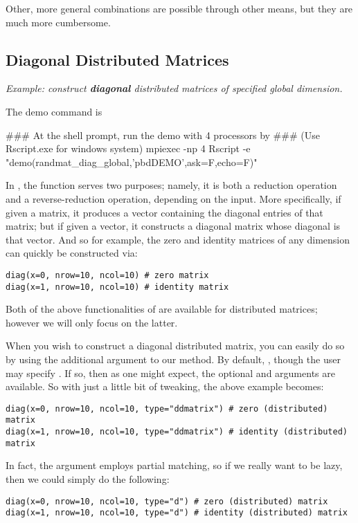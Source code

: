 Other, more general combinations are possible through other means, but they are 
much more cumbersome.




\subsection{Diagonal Distributed Matrices}\label{sub:diag}

\emph{Example:  construct \textbf{diagonal} distributed matrices of specified
global dimension.}

The demo command is
\begin{Command}
### At the shell prompt, run the demo with 4 processors by
### (Use Rscript.exe for windows system)
mpiexec -np 4 Rscript -e "demo(randmat_diag_global,'pbdDEMO',ask=F,echo=F)"
\end{Command}

In , the  function serves two purposes; namely, it is 
both a reduction operation and a reverse-reduction operation, depending on the 
input.  More specifically, if given a matrix, it produces a vector containing 
the diagonal entries of that matrix; but if given a vector, it constructs a 
diagonal matrix whose diagonal is that vector.  And so for example, the zero and 
identity matrices of any dimension can quickly be constructed via:
\begin{lstlisting}[language=rr,title=Diagonal Matrices in R]
diag(x=0, nrow=10, ncol=10) # zero matrix
diag(x=1, nrow=10, ncol=10) # identity matrix
\end{lstlisting}

Both of the above functionalities of  are available for distributed 
matrices; however we will only focus on the latter. 

When you wish to construct a diagonal distributed matrix, you can easily do so 
by using the additional  argument to our  method.  By 
default, , though the user may specify 
.  If so, then as one might expect, the optional 
 and  arguments are available.  So with just a little 
bit of tweaking, the above example becomes:
\begin{lstlisting}[language=rr,title=Diagonal Matrices in pbdR]
diag(x=0, nrow=10, ncol=10, type="ddmatrix") # zero (distributed) matrix
diag(x=1, nrow=10, ncol=10, type="ddmatrix") # identity (distributed) matrix
\end{lstlisting}
In fact, the  argument employs partial matching, so if we really 
want to be lazy, then we could simply do the following:
\begin{lstlisting}[language=rr,title=Diagonal Matrices in pbdR]
diag(x=0, nrow=10, ncol=10, type="d") # zero (distributed) matrix
diag(x=1, nrow=10, ncol=10, type="d") # identity (distributed) matrix
\end{lstlisting}

